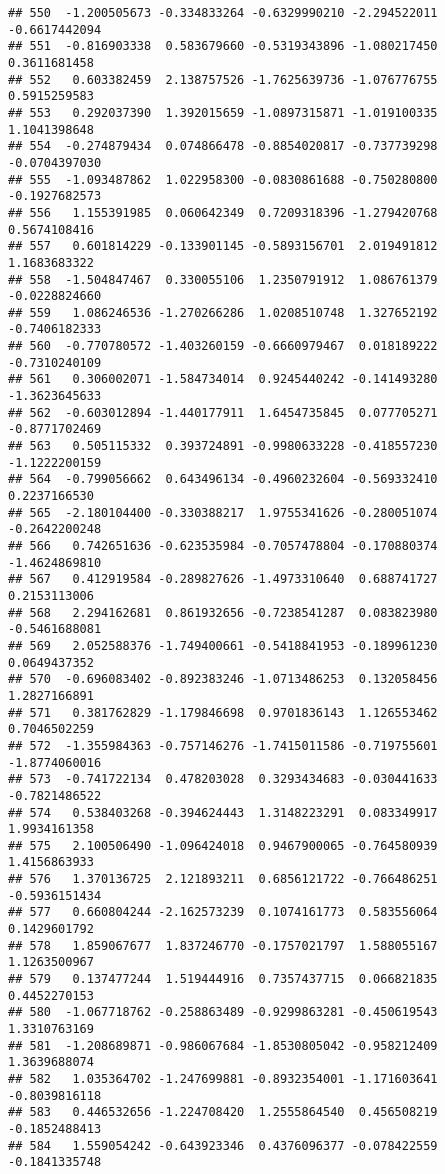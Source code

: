 \documentclass[
]{article}
\begin{document}
\begin{verbatim}
## 550  -1.200505673 -0.334833264 -0.6329990210 -2.294522011 -0.6617442094
## 551  -0.816903338  0.583679660 -0.5319343896 -1.080217450  0.3611681458
## 552   0.603382459  2.138757526 -1.7625639736 -1.076776755  0.5915259583
## 553   0.292037390  1.392015659 -1.0897315871 -1.019100335  1.1041398648
## 554  -0.274879434  0.074866478 -0.8854020817 -0.737739298 -0.0704397030
## 555  -1.093487862  1.022958300 -0.0830861688 -0.750280800 -0.1927682573
## 556   1.155391985  0.060642349  0.7209318396 -1.279420768  0.5674108416
## 557   0.601814229 -0.133901145 -0.5893156701  2.019491812  1.1683683322
## 558  -1.504847467  0.330055106  1.2350791912  1.086761379 -0.0228824660
## 559   1.086246536 -1.270266286  1.0208510748  1.327652192 -0.7406182333
## 560  -0.770780572 -1.403260159 -0.6660979467  0.018189222 -0.7310240109
## 561   0.306002071 -1.584734014  0.9245440242 -0.141493280 -1.3623645633
## 562  -0.603012894 -1.440177911  1.6454735845  0.077705271 -0.8771702469
## 563   0.505115332  0.393724891 -0.9980633228 -0.418557230 -1.1222200159
## 564  -0.799056662  0.643496134 -0.4960232604 -0.569332410  0.2237166530
## 565  -2.180104400 -0.330388217  1.9755341626 -0.280051074 -0.2642200248
## 566   0.742651636 -0.623535984 -0.7057478804 -0.170880374 -1.4624869810
## 567   0.412919584 -0.289827626 -1.4973310640  0.688741727  0.2153113006
## 568   2.294162681  0.861932656 -0.7238541287  0.083823980 -0.5461688081
## 569   2.052588376 -1.749400661 -0.5418841953 -0.189961230  0.0649437352
## 570  -0.696083402 -0.892383246 -1.0713486253  0.132058456  1.2827166891
## 571   0.381762829 -1.179846698  0.9701836143  1.126553462  0.7046502259
## 572  -1.355984363 -0.757146276 -1.7415011586 -0.719755601 -1.8774060016
## 573  -0.741722134  0.478203028  0.3293434683 -0.030441633 -0.7821486522
## 574   0.538403268 -0.394624443  1.3148223291  0.083349917  1.9934161358
## 575   2.100506490 -1.096424018  0.9467900065 -0.764580939  1.4156863933
## 576   1.370136725  2.121893211  0.6856121722 -0.766486251 -0.5936151434
## 577   0.660804244 -2.162573239  0.1074161773  0.583556064  0.1429601792
## 578   1.859067677  1.837246770 -0.1757021797  1.588055167  1.1263500967
## 579   0.137477244  1.519444916  0.7357437715  0.066821835  0.4452270153
## 580  -1.067718762 -0.258863489 -0.9299863281 -0.450619543  1.3310763169
## 581  -1.208689871 -0.986067684 -1.8530805042 -0.958212409  1.3639688074
## 582   1.035364702 -1.247699881 -0.8932354001 -1.171603641 -0.8039816118
## 583   0.446532656 -1.224708420  1.2555864540  0.456508219 -0.1852488413
## 584   1.559054242 -0.643923346  0.4376096377 -0.078422559 -0.1841335748

\end{verbatim}
\end{document}
